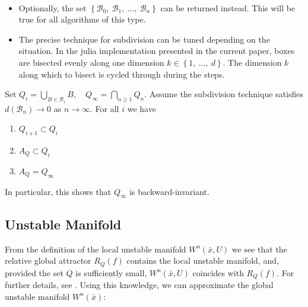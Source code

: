 \begin{remark}\
    \begin{itemize}
        \item Optionally, the set 
        $\left\{ \mathcal{B}_0,\ \mathcal{B}_1,\ \dotsc,\ \mathcal{B}_n \right\}$
        can be returned instead. This will be true for all algorithms of this type.
        \item The precise technique for subdivision can be tuned depending on the situation. 
        In the julia implementation presented in the current paper, boxes are bisected 
        evenly along one dimension $k \in \left\{1,\ \dotsc,\ d\right\}$. The dimension $k$ 
        along which to bisect is cycled through during the steps. \\
    \end{itemize}
\end{remark}

\begin{proposition}\label{thm:cover}
    \cite*{algGAIO,subalg} Set 
    $Q_i = \bigcup_{B \in \mathcal{B}_i} B,\quad Q_\infty = \bigcap_{n \geq 1} Q_n$. 
    Assume the subdivision technique satisfies $d(\mathcal{B}_n) \to 0$ as $n \to \infty$. 
    For all $i$ we have

    \begin{enumerate}
        \item $Q_{i+1} \subset Q_i$
        \item $A_Q \subset Q_i$ 
        \item $A_Q = Q_\infty$
    \end{enumerate}

    In particular, this shows that $Q_\infty$ is backward-invariant. 
\end{proposition}


\subsection{Unstable Manifold}

From the definition of the local unstable manifold $W^u(\bar{x}, U)$ we see that the 
relative global attractor $R_Q(f)$ contains the local unstable manifold, and, provided the 
set $Q$ is sufficiently small, $W^u(\bar{x}, U)$ coincides with $R_Q(f)$. For further 
details, see \cite*{manifold, geodynbook}. Using this knowledge, we can approximate the 
global unstable manifold $W^u(\bar{x})$: 

